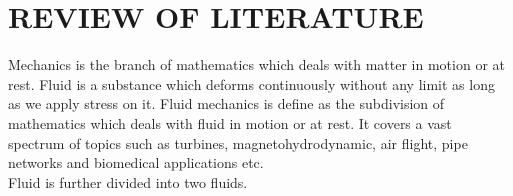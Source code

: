 \chapter{REVIEW OF LITERATURE}
\indent\indent\indent  Mechanics is the branch of mathematics which deals with matter in motion or at rest. Fluid is a substance which deforms continuously without any limit as long as we apply stress on it. Fluid mechanics is define as the subdivision of mathematics which deals with fluid in motion or at rest. It covers a vast spectrum of topics such as turbines, magnetohydrodynamic, air flight, pipe networks and biomedical applications etc.\\
 \noindent Fluid is further divided into two fluids.
